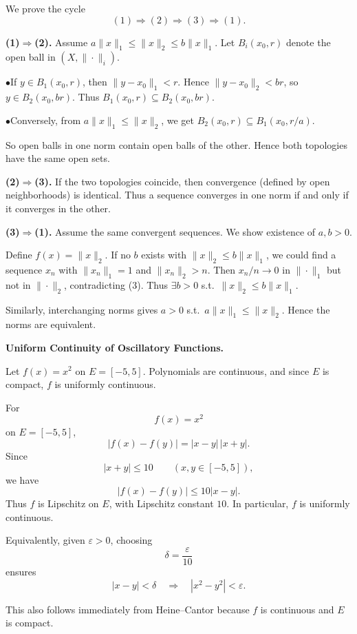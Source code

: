 \begin{solution}

We prove the cycle
\[
(1)\Rightarrow(2)\Rightarrow(3)\Rightarrow(1).
\]

\par\medskip\noindent\textbf{(1)$\Rightarrow$(2).}\quad
Assume $a\|x\|_1 \le \|x\|_2 \le b\|x\|_1$.
Let $B_i(x_0,r)$ denote the open ball in $(X,\|\cdot\|_i)$.

	\par\smallskip\noindent\(\bullet\)\quad If $y\in B_1(x_0,r)$, then $\|y-x_0\|_1 < r$.
	Hence $\|y-x_0\|_2 < br$, so $y\in B_2(x_0,br)$.
	Thus $B_1(x_0,r)\subseteq B_2(x_0,br)$.
	\par\smallskip\noindent\(\bullet\)\quad Conversely, from $a\|x\|_1\le\|x\|_2$, we get
	$B_2(x_0,r)\subseteq B_1(x_0,r/a)$.

So open balls in one norm contain open balls of the other.
Hence both topologies have the same open sets.

\par\medskip\noindent\textbf{(2)$\Rightarrow$(3).}\quad
If the two topologies coincide, then convergence (defined by open neighborhoods)
is identical. Thus a sequence converges in one norm if and only if it converges in the other.

\par\medskip\noindent\textbf{(3)$\Rightarrow$(1).}\quad
Assume the same convergent sequences.
We show existence of $a,b>0$.

Define $f(x)=\|x\|_2$.
If no $b$ exists with $\|x\|_2\le b\|x\|_1$,
we could find a sequence $x_n$ with $\|x_n\|_1=1$ and $\|x_n\|_2>n$.
Then $x_n/n\to 0$ in $\|\cdot\|_1$ but not in $\|\cdot\|_2$, contradicting (3).
Thus $\exists b>0$ s.t.\ $\|x\|_2\le b\|x\|_1$.

Similarly, interchanging norms gives $a>0$ s.t.\ $a\|x\|_1\le\|x\|_2$.
Hence the norms are equivalent.
\end{solution}

\begin{problem}[CP-II-0082]
\label{prob:cp-ii-0082}
\textbf{Uniform Continuity of Oscillatory Functions.}

\hspace*{1.5em}Let $f(x) = x^2$ on $E=[-5,5]$.
		Polynomials are continuous, and since $E$ is compact, $f$ is uniformly continuous.
\end{problem}

\begin{solution}
For
\[
f(x)=x^2
\]
on \(E=[-5,5]\),
\[
|f(x)-f(y)|
=
|x-y|\,|x+y|.
\]
Since
\[
|x+y|\le10
\qquad(x,y\in[-5,5]),
\]
we have
\[
|f(x)-f(y)|
\le
10|x-y|.
\]
Thus \(f\) is Lipschitz on \(E\), with Lipschitz constant \(10\). In particular, \(f\) is uniformly continuous.

Equivalently, given \(\varepsilon>0\), choosing
\[
\delta=\frac{\varepsilon}{10}
\]
ensures
\[
|x-y|<\delta
\quad\Longrightarrow\quad
|x^2-y^2|<\varepsilon.
\]

This also follows immediately from Heine--Cantor because \(f\) is continuous and \(E\) is compact.
\end{solution}


